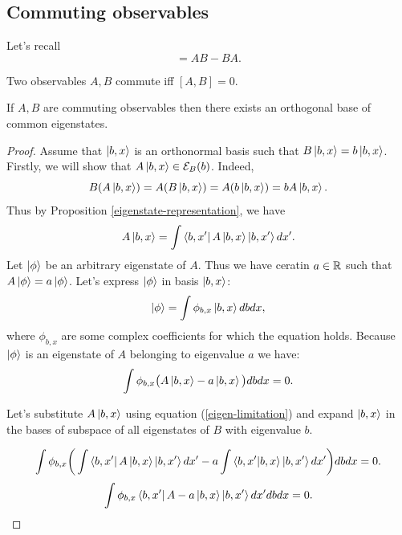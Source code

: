 \documentclass[main.tex]{subfiles}
\begin{document}
\subsection{Commuting observables}

Let's recall
\begin{equation}
[A, B] = AB - BA.
\end{equation}

\begin{definition}
Two observables $A, B$ commute iff $[A, B] = 0$.
\end{definition}
\begin{theorem}
If $A, B$ are commuting observables then there exists an orthogonal base of common eigenstates.
\end{theorem}
\begin{proof}
Assume that $\ket{b,x}$ is an orthonormal basis such that $B \ket{b,x} = b \ket{b,x}$.
Firstly, we will show that $A \ket{b,x} \in \mathcal{E}_B(b)$. Indeed,
\begin{equation}
B(A \ket{b,x}) = A(B \ket{b,x}) = A(b \ket{b,x}) = b A\ket{b,x}.
\end{equation}
Thus by Proposition \ref{eigenstate-representation}, we have 
\begin{equation}
\label{eigen-limitation}
A \ket{b,x} = \int \bra{b, x'} A \ket{b, x} \ket{b, x'} d x'.
\end{equation}
Let $\ket{\phi}$ be an arbitrary eigenstate of $A$. Thus we have ceratin $a\in \mathbb{R}$ such that 
$A \ket{\phi} = a \ket{\phi}$. Let's express $\ket{\phi}$ in basis $\ket{b,x}$:
\begin{equation}
\ket{\phi} = \int \phi_{b, x} \ket{b,x} db dx,
\end{equation}
where $\phi_{b, x}$ are some complex coefficients for which the equation holds.
Because $\ket{\phi}$ is an eigenstate of $A$ belonging to eigenvalue $a$ we have:
\begin{equation}
\int \phi_{b, x} \big( A\ket{b, x} - a\ket{b, x}\big)dbdx = 0.
\end{equation}


Let's substitute $A\ket{b, x}$ using equation (\ref{eigen-limitation}) and expand $\ket{b, x}$ in the bases of subspace of all eigenstates of $B$ with eigenvalue $b$.

\begin{equation}
\int \phi_{b, x} \bigg( \int \bra{b, x'} A \ket{b, x}  \ket{b, x'} d x' - a\int \bra{b, x'}\ket{b, x}  \ket{b, x'} d x'\bigg)dbdx = 0.
\end{equation}
\begin{equation}
\int \phi_{b, x} \bra{b, x'} A - a \ket{b, x}  \ket{b, x'}  d x'dbdx = 0.
\end{equation}


\end{proof}
\end{document}
